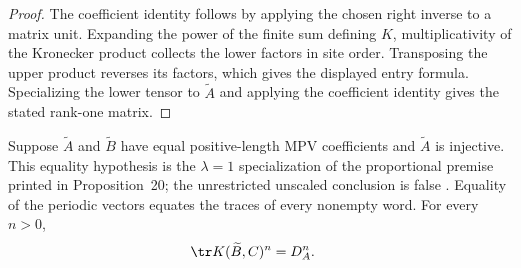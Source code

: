 \begin{proof}
    \leanok
    The coefficient identity follows by applying the chosen right inverse to a
    matrix unit.  Expanding the power of the finite sum defining $K$,
    multiplicativity of the Kronecker product collects the lower factors in
    site order.  Transposing the upper product reverses its factors, which gives
    the displayed entry formula.  Specializing the lower tensor to
    $\widetilde A$ and applying the coefficient identity gives the stated
    rank-one matrix.
\end{proof}

\begin{lemma}
    \label{thm:mps_reduction_cross_trace_open}
    \leanok
    Suppose $\widetilde A$ and $\widetilde B$ have equal positive-length
    MPV coefficients and $\widetilde A$ is injective.  This equality hypothesis
    is the $\lambda=1$ specialization of the proportional premise printed in
    Proposition~20; the unrestricted unscaled conclusion is false
    \cite{gap:mgsc18_reduction_proportionality_scalar}.  Equality of the
    periodic vectors equates the traces of every nonempty word.  For every
    $n>0$,
    \begin{align}
        \tr K(\widetilde B,C)^n
         & =D_A^n.
        \notag
    \end{align}


\end{lemma}
